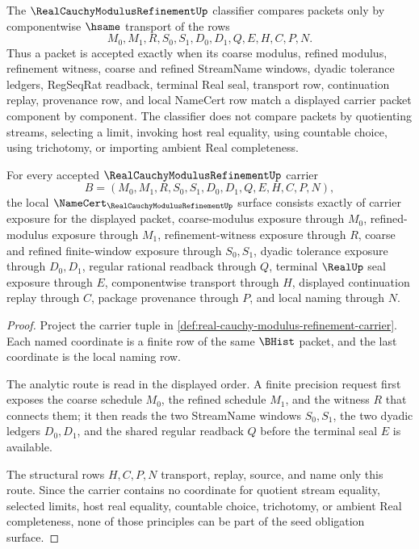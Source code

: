 \begin{definition}
\label{def:real-cauchy-modulus-refinement-classifier}
The $\RealCauchyModulusRefinementUp$ classifier compares packets only by componentwise $\hsame$ transport of the rows
$$
M_0,M_1,R,S_0,S_1,D_0,D_1,Q,E,H,C,P,N.
$$
Thus a packet is accepted exactly when its coarse modulus, refined modulus, refinement witness, coarse and refined StreamName windows, dyadic tolerance ledgers, RegSeqRat readback, terminal Real seal, transport row, continuation replay, provenance row, and local NameCert row match a displayed carrier packet component by component. The classifier does not compare packets by quotienting streams, selecting a limit, invoking host real equality, using countable choice, using trichotomy, or importing ambient Real completeness.
\end{definition}

\begin{theorem}
\label{thm:real-cauchy-modulus-refinement-namecert-obligations}
For every accepted $\RealCauchyModulusRefinementUp$ carrier
$$
B=(M_0,M_1,R,S_0,S_1,D_0,D_1,Q,E,H,C,P,N),
$$
the local $\NameCert_{\RealCauchyModulusRefinementUp}$ surface consists exactly of carrier exposure for the displayed packet, coarse-modulus exposure through $M_0$, refined-modulus exposure through $M_1$, refinement-witness exposure through $R$, coarse and refined finite-window exposure through $S_0,S_1$, dyadic tolerance exposure through $D_0,D_1$, regular rational readback through $Q$, terminal $\RealUp$ seal exposure through $E$, componentwise transport through $H$, displayed continuation replay through $C$, package provenance through $P$, and local naming through $N$.
\end{theorem}
\begin{proof}
Project the carrier tuple in \autoref{def:real-cauchy-modulus-refinement-carrier}. Each named coordinate is a finite row of the same $\BHist$ packet, and the last coordinate is the local naming row.

The analytic route is read in the displayed order. A finite precision request first exposes the coarse schedule $M_0$, the refined schedule $M_1$, and the witness $R$ that connects them; it then reads the two StreamName windows $S_0,S_1$, the two dyadic ledgers $D_0,D_1$, and the shared regular readback $Q$ before the terminal seal $E$ is available.

The structural rows $H,C,P,N$ transport, replay, source, and name only this route. Since the carrier contains no coordinate for quotient stream equality, selected limits, host real equality, countable choice, trichotomy, or ambient Real completeness, none of those principles can be part of the seed obligation surface.
\end{proof}

